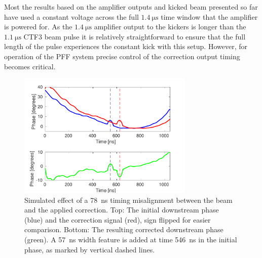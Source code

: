 
Most the results based on the amplifier outputs and kicked beam presented so far have used a constant voltage across the full \(1.4~\mathrm{\mu s}\) time window that the amplifier is powered for. As the \(1.4~\mathrm{\mu s}\) amplifier output to the kickers is longer than the \(1.1~\mathrm{\mu s}\) CTF3 beam pulse it is relatively straightforward to ensure that the full length of the pulse experiences the constant kick with this setup. However, for operation of the PFF system precise control of the correction output timing becomes critical. 

\begin{figure}
  \centering
  \includegraphics[width=0.75\textwidth]{Figures/commissioning/simCorrDelay}
  \caption{Simulated effect of a 78~ns timing misalignment between the beam and the applied correction. Top: The initial downstream phase (blue) and the correction signal (red), sign flipped for easier comparison. Bottom: The resulting corrected downstream phase (green). A 57~ns width feature is added at time 546~ns in the initial phase, as marked by vertical dashed lines. }
  \label{f:simCorrDelay}
\end{figure}


